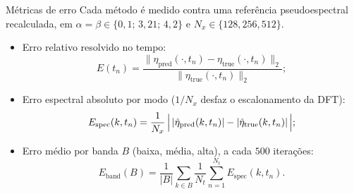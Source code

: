 \begin{frame}{Métricas de erro}
  Cada método é medido contra uma referência pseudoespectral recalculada, em
  $\alpha = \beta \in \{0{,}1;\, 3{,}21;\, 4{,}2\}$ e
  $N_x \in \{128, 256, 512\}$.
  \begin{itemize}[<+->]
    \item Erro relativo resolvido no tempo:
          \[
            E(t_n) = \frac{\bigl\| \eta_{\text{pred}}(\cdot, t_n) - \eta_{\text{true}}(\cdot, t_n) \bigr\|_2}
                          {\bigl\| \eta_{\text{true}}(\cdot, t_n) \bigr\|_2} ;
          \]
    \item Erro espectral absoluto por modo ($1/N_x$ desfaz o escalonamento da DFT):
          \[
            E_{\text{spec}}(k, t_n) = \frac{1}{N_x}\,\Bigl|\, |\hat\eta_{\text{pred}}(k,t_n)| - |\hat\eta_{\text{true}}(k,t_n)| \,\Bigr| ;
          \]
    \item Erro médio por banda $B$ (baixa, média, alta), a cada $500$ iterações:
          \[
            E_{\text{band}}(B) = \frac{1}{|B|} \sum_{k \in B} \frac{1}{N_t} \sum_{n=1}^{N_t} E_{\text{spec}}(k, t_n) .
          \]
  \end{itemize}
\end{frame}

